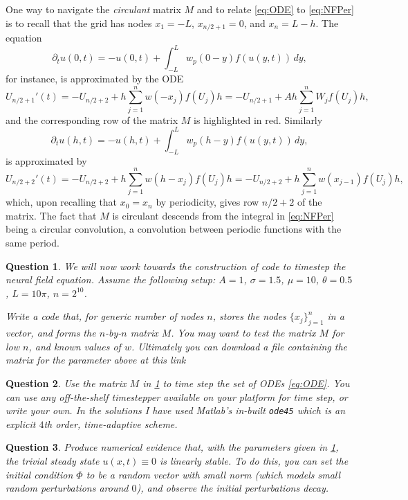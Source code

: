 \documentclass[a4paper]{siamonline220329}
\theoremstyle{plain}
\newtheorem{question}{Question}
\begin{document}
One way to navigate the \textit{circulant} matrix $M$ and to relate \cref{eq:ODE} to
\cref{eq:NFPer} is to
recall that the grid has nodes $x_1=-L$, $x_{n/2+1} = 0$, and $x_{n}=L-h$. The
equation
\[
 \partial_{t}u(0,t) = -u(0,t) + \int_{-L}^Lw_p(0-y)f(u(y,t))\, dy,
\]
for instance, is approximated by the ODE
\[
  U_{n/2+1}'(t) = -U_{n/2+2} + h \sum_{j=1}^n w(-x_j) f(U_j) h
                = -U_{n/2+1} + Ah \sum_{j=1}^n W_jf(U_j) h,
\]
and the corresponding row of the matrix $M$ is highlighted in red. Similarly
\[
 \partial_{t}u(h,t) = -u(h,t) + \int_{-L}^Lw_p(h-y)f(u(y,t))\, dy,
\]
is approximated by
\[
  U_{n/2+2}'(t) = -U_{n/2+2} + h \sum_{j=1}^n w(h-x_j) f(U_j) h
                = -U_{n/2+2} + h \sum_{j=1}^n w(x_{j-1}) f(U_j) h,
\]
which, upon recalling that $x_0=x_n$ by periodicity, gives row $n/2+2$ of the matrix.
The fact that $M$ is circulant descends from the integral in \cref{eq:NFPer} being
a circular convolution, a convolution between periodic functions with the same period.

\begin{question} \label{question:codeMatrix}
  We will now work towards the construction of code to timestep the neural field
  equation. Assume the following setup: $A = 1$, $\sigma=1.5$, $\mu =10$,
  $\theta = 0.5$, $L = 10\pi$, $n = 2^{10}$.

  Write a code that, for generic number of nodes $n$, stores the nodes
  $\{x_j\}_{j=1}^n$ in a vector, and forms the $n$-by-$n$ matrix $M$. You may want to
  test the matrix $M$ for low $n$, and known values of $w$. Ultimately you can
  download a file containing the matrix for the parameter above at this link
\end{question}

\begin{question} 
  Use the matrix $M$ in \cref{question:codeMatrix} to time step the set of ODEs
  \cref{eq:ODE}. You can use any off-the-shelf timestepper available on your platform
  for time step, or write your own. In the solutions I have used Matlab's in-built
  \texttt{ode45} which is an explicit $4$th order, time-adaptive scheme.
\end{question}

\begin{question} 
  Produce numerical evidence that, with the parameters given in
  \cref{question:codeMatrix}, the trivial steady state $u(x,t) \equiv 0$ is linearly
  stable. To do this, you can set the initial condition $\Phi$ to be a random vector
  with small norm (which models small random perturbations around $0$), and observe the
  initial perturbations decay.
\end{question}
\end{document}
